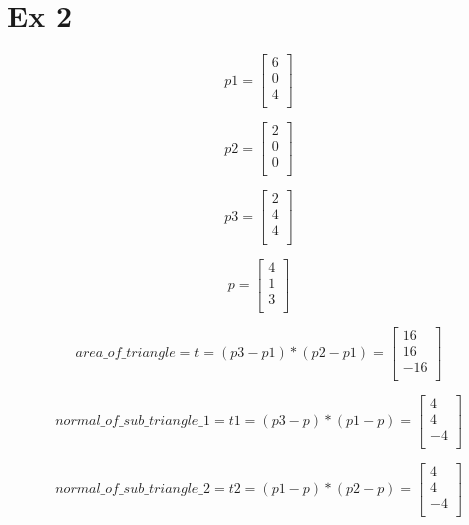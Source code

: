 \documentclass{article}
\begin{document}
\section*{Ex 2}

\[
    p1 = \begin{bmatrix}
        6 \\
        0 \\
        4 \\
    \end{bmatrix}
\]

\[
    p2 = \begin{bmatrix}
        2 \\
        0 \\
        0 \\
    \end{bmatrix}
\]

\[
    p3 = \begin{bmatrix}
        2 \\
        4 \\
        4 \\
    \end{bmatrix}
\]

\[
    p = \begin{bmatrix}
        4 \\
        1 \\
        3 \\
    \end{bmatrix}
\]

\[
    area\_of\_triangle = t = (p3 - p1) * (p2 - p1) =
    \begin{bmatrix}
        16  \\
        16  \\
        -16 \\
    \end{bmatrix}
\]

\[
    normal\_of\_sub\_triangle\_1 = t1 = (p3 - p) * (p1 - p) =
    \begin{bmatrix}
        4  \\
        4  \\
        -4 \\
    \end{bmatrix}
\]

\[
    normal\_of\_sub\_triangle\_2 = t2 = (p1 - p) * (p2 - p) =
    \begin{bmatrix}
        4  \\
        4  \\
        -4 \\
    \end{bmatrix}
\]
\end{document}
